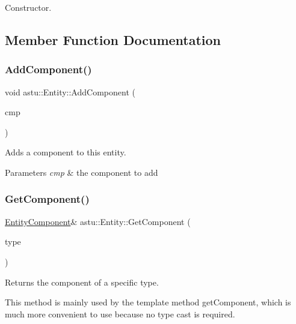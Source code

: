 Constructor. 

\subsection{Member Function Documentation}
\mbox{\label{classastu_1_1Entity_ab8f47f4de88139f9202466b726e61aee}} 
\subsubsection{\texorpdfstring{Add\+Component()}{AddComponent()}}
{\footnotesize\ttfamily void astu\+::\+Entity\+::\+Add\+Component (\begin{DoxyParamCaption}\item[{std\+::shared\+\_\+ptr$<$ \hyperlink{classastu_1_1EntityComponent}{Entity\+Component} $>$}]{cmp }\end{DoxyParamCaption})}

Adds a component to this entity.


\begin{DoxyParams}{Parameters}
{\em cmp} & the component to add \\
\hline
\end{DoxyParams}
\mbox{\label{classastu_1_1Entity_a3d9bb583859f1a941fdaad76f5093323}} 
\subsubsection{\texorpdfstring{Get\+Component()}{GetComponent()}\hspace{0.1cm}{\footnotesize\ttfamily [1/3]}}
{\footnotesize\ttfamily \hyperlink{classastu_1_1EntityComponent}{Entity\+Component}\& astu\+::\+Entity\+::\+Get\+Component (\begin{DoxyParamCaption}\item[{const std\+::type\+\_\+index \&}]{type }\end{DoxyParamCaption})}

Returns the component of a specific type.

This method is mainly used by the template method {\ttfamily get\+Component}, which is much more convenient to use because no type cast is required.

